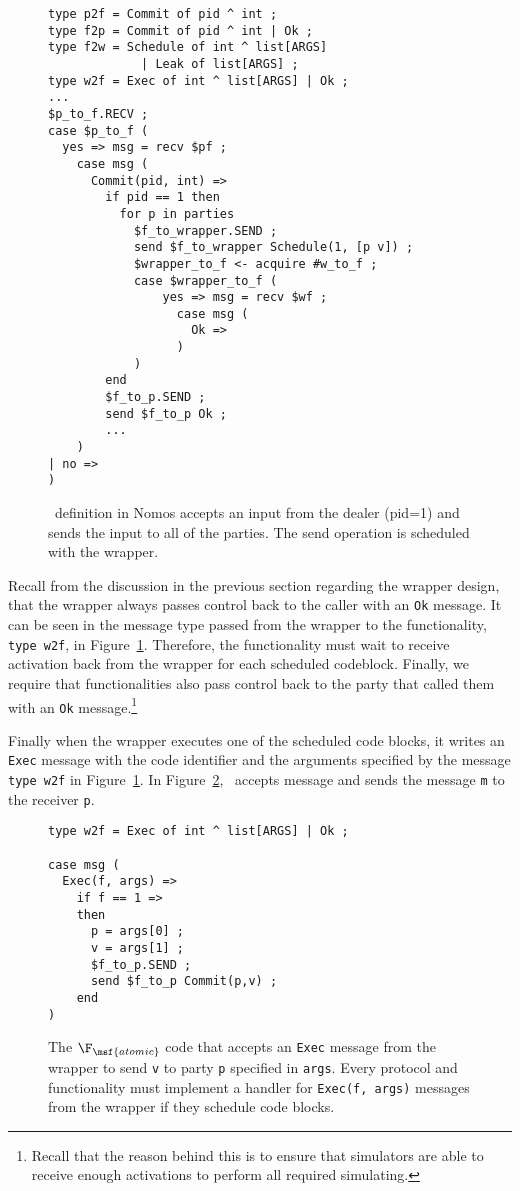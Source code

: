 \begin{figure}
\begin{lstlisting}[basicstyle=\small\ttfamily, frame=single]
type p2f = Commit of pid ^ int ;
type f2p = Commit of pid ^ int | Ok ;
type f2w = Schedule of int ^ list[ARGS] 
             | Leak of list[ARGS] ;
type w2f = Exec of int ^ list[ARGS] | Ok ;
...
$p_to_f.RECV ;
case $p_to_f (
  yes => msg = recv $pf ;
    case msg (
      Commit(pid, int) => 
        if pid == 1 then
    	  for p in parties
    	    $f_to_wrapper.SEND ;
    	    send $f_to_wrapper Schedule(1, [p v]) ;
    	    $wrapper_to_f <- acquire #w_to_f ;
    	    case $wrapper_to_f (
    	    	yes => msg = recv $wf ;
    	  	      case msg (
    	  	        Ok =>
    	  	      )
    	    )
    	end
    	$f_to_p.SEND ;
    	send $f_to_p Ok ;
    	...
    )
| no =>
)
\end{lstlisting}
\caption{\Frbc~definition in Nomos accepts an input from the dealer (pid=1) and \Eventually sends the input to all of the parties. The send operation is scheduled with the wrapper.}
\label{fig:nomos:frbc}
\end{figure}

Recall from the discussion in the previous section regarding the wrapper design, that the wrapper always passes control back to the caller with an \texttt{Ok} message.
It can be seen in the message type passed from the wrapper to the functionality, \texttt{type w2f}, in Figure~\ref{fig:nomos:frbc}.
Therefore, the functionality must wait to receive activation back from the wrapper for each scheduled codeblock.
Finally, we require that functionalities also pass control back to the party that called them with an \texttt{Ok} message.\footnote{Recall that the reason behind this is to ensure that simulators are able to receive enough activations to perform all required simulating.}

Finally when the wrapper executes one of the scheduled code blocks, it writes an \texttt{Exec} message with the code identifier and the arguments specified by the message \texttt{type w2f} in Figure~\ref{fig:nomos:frbc}.
In Figure~\ref{fig:nomos:frbcexec}, \Frbc~accepts \Exec message and sends the message \texttt{m} to the receiver \texttt{p}.

\begin{figure}
\begin{lstlisting}[basicstyle=\small\ttfamily, frame=single]
type w2f = Exec of int ^ list[ARGS] | Ok ; 

case msg (
  Exec(f, args) =>
    if f == 1 =>
	then
	  p = args[0] ;
	  v = args[1] ;
	  $f_to_p.SEND ;
	  send $f_to_p Commit(p,v) ;
	end
)
\end{lstlisting}
\caption{The $\F_{\msf{atomic}}$ code that accepts an \texttt{Exec} message from the wrapper to send \texttt{v} to party \texttt{p} specified in \texttt{args}. Every protocol and functionality must implement a handler for \texttt{Exec(f, args)} messages from the wrapper if they schedule code blocks.}
\label{fig:nomos:frbcexec}
\end{figure}

